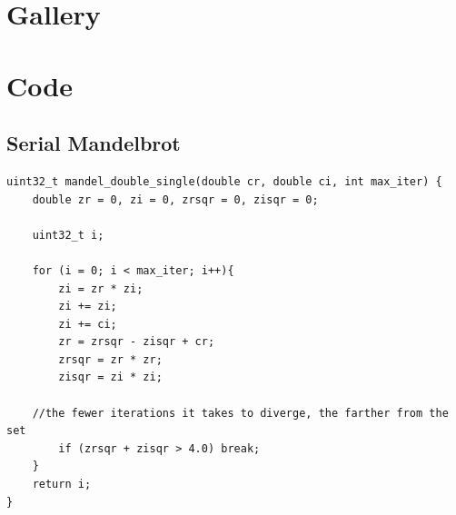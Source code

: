 \documentclass{article}
\begin{document}
    \newcommand{\centeredimage}[2]{
        \vspace*{\fill}%
        \noindent%
        \makebox[\textwidth]{\texttt{[image: \#2]}}%
        \vspace*{2cm}%
    }

    \pagebreak
    \section{Gallery}
        \centeredimage{width=0.75\paperwidth}{gallery/Image2.png}
        \clearpage
        \centeredimage{width=0.75\paperwidth}{gallery/Image3.png}
        \clearpage
        \centeredimage{width=0.75\paperwidth}{gallery/Image4.png}
        \clearpage
        \centeredimage{width=0.75\paperwidth}{gallery/Image5.png}
        \clearpage
        \centeredimage{width=0.75\paperwidth}{gallery/Image6.png}
        \clearpage

    \section{Code}
        \lstset{language=C,stringstyle=\ttfamily, showstringspaces=false, numbers=left, frame=single, framexrightmargin=0pt, columns=fullflexible, breaklines=true, breakatwhitespace=true}

        \subsection{Serial Mandelbrot}\label{appendix:serial}
\begin{lstlisting}
uint32_t mandel_double_single(double cr, double ci, int max_iter) {
    double zr = 0, zi = 0, zrsqr = 0, zisqr = 0;

    uint32_t i;

    for (i = 0; i < max_iter; i++){
		zi = zr * zi;
		zi += zi;
		zi += ci;
		zr = zrsqr - zisqr + cr;
		zrsqr = zr * zr;
		zisqr = zi * zi;
		
    //the fewer iterations it takes to diverge, the farther from the set
		if (zrsqr + zisqr > 4.0) break;
    }
    return i;
}
\end{lstlisting}
\end{document}
